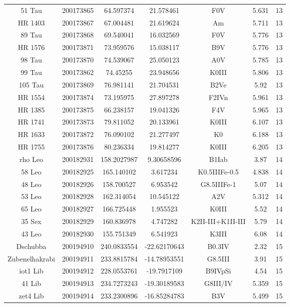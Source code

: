 \begin{table*}
\begin{tabular}{ccccccc}
51 Tau & 200173865 & 64.597374 & 21.578461 & F0V & 5.631 & 13 \\
HR 1403 & 200173867 & 67.004481 & 21.619624 & Am & 5.711 & 13 \\
89 Tau & 200173868 & 69.540041 & 16.032569 & F0V & 5.776 & 13 \\
HR 1576 & 200173871 & 73.959576 & 15.038117 & B9V & 5.776 & 13 \\
98 Tau & 200173870 & 74.539067 & 25.050123 & A0V & 5.785 & 13 \\
99 Tau & 200173862 & 74.45255 & 23.948656 & K0III & 5.806 & 13 \\
105 Tau & 200173869 & 76.981141 & 21.704531 & B2Ve & 5.92 & 13 \\
HR 1554 & 200173874 & 73.195975 & 27.897278 & F2IVn & 5.961 & 13 \\
HR 1385 & 200173875 & 66.238157 & 19.041326 & F4V & 5.965 & 13 \\
HR 1741 & 200173873 & 79.811052 & 20.133961 & K0III & 6.107 & 13 \\
HR 1633 & 200173872 & 76.090102 & 21.277497 & K0 & 6.188 & 13 \\
HR 1755 & 200173876 & 80.236334 & 19.814277 & K0III & 6.205 & 13 \\
rho Leo & 200182931 & 158.2027987 & 9.30658596 & B1Iab & 3.87 & 14 \\
58 Leo & 200182925 & 165.140102 & 3.617234 & K0.5IIIFe-0.5 & 4.838 & 14 \\
48 Leo & 200182926 & 158.700527 & 6.953542 & G8.5IIIFe-1 & 5.07 & 14 \\
53 Leo & 200182928 & 162.314054 & 10.545122 & A2V & 5.312 & 14 \\
65 Leo & 200182927 & 166.725448 & 1.955523 & K0III & 5.52 & 14 \\
35 Sex & 200182929 & 160.836978 & 4.747282 & K2II-III+K1II-III & 5.79 & 14 \\
43 Leo & 200182930 & 155.751349 & 6.541923 & K3III & 6.08 & 14 \\
Dschubba & 200194910 & 240.0833554 & -22.62170643 & B0.3IV & 2.32 & 15 \\
Zubenelhakrabi & 200194911 & 233.8815784 & -14.78953551 & G8.5III & 3.91 & 15 \\
iot1 Lib & 200194912 & 228.0553761 & -19.7917109 & B9IVpSi & 4.54 & 15 \\
41 Lib & 200194913 & 234.7273243 & -19.30189583 & G8III/IV & 5.359 & 15 \\
zet4 Lib & 200194914 & 233.2300896 & -16.85284783 & B3V & 5.499 & 15 \\

\end{tabular}
\end{table*}
